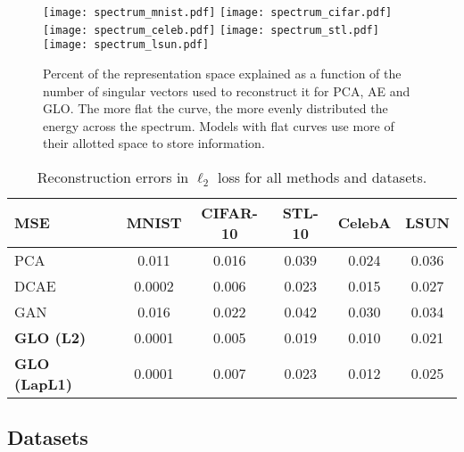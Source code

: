 \documentclass{article}
\newcommand{\GNAT}{GLO}
\begin{document}
\begin{figure}[t]
  \texttt{[image: spectrum\_mnist.pdf]}\hfill
  \texttt{[image: spectrum\_cifar.pdf]}\hfill
  \texttt{[image: spectrum\_celeb.pdf]}\hfill
  \texttt{[image: spectrum\_stl.pdf]}\hfill
  \texttt{[image: spectrum\_lsun.pdf]}
  \caption{Percent of the representation space explained as a function of the number of singular vectors used to reconstruct it for PCA, AE and \GNAT{}.
  The more flat the curve, the more evenly distributed the energy across the spectrum.  Models with flat curves use more of their allotted space to store information.}
  \label{fig:eigenspectrum}
\end{figure}
\begin{table}[t]
  \begin{center}
  \begin{tabular}{@{}llccccc@{}}
    \toprule
    MSE && MNIST  & CIFAR-10 & STL-10 & CelebA & LSUN\\
    \midrule
    PCA && 0.011 & 0.016 & 0.039 & 0.024 & 0.036 \\
    DCAE && 0.0002 & 0.006 & 0.023 & 0.015 & 0.027 \\
    GAN  && 0.016 & 0.022 & 0.042 & 0.030 & 0.034  \\
    \midrule
    \textbf{\GNAT{} (L2)}  && 0.0001 & 0.005 & 0.019 & 0.010 & 0.021 \\
    \textbf{\GNAT{} (LapL1)}  && 0.0001 & 0.007 & 0.023 & 0.012 & 0.025 \\
    \bottomrule
  \end{tabular}
  \end{center}
  \caption{
    Reconstruction errors in $\ell_2$ %
    loss for all methods
    and datasets.
  }
  \label{table:errors}
\end{table}

\subsection{Datasets}\label{sec:experiments:datasets}
\end{document}
